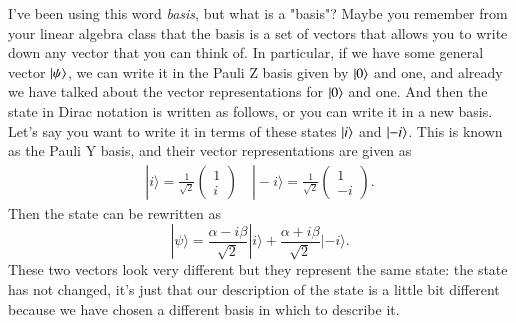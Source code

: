 I've been using this word \emph{basis}, but what is a "basis"? Maybe you remember from your linear algebra class that the basis is a set of vectors that allows you to write down any vector that you can think of. In particular, if we have some general vector $\ket{\psi}$, we can write it in the Pauli Z basis given by $\ket{0}$ and one, and already we have talked about the vector representations for $\ket{0}$ and one. And then the state in Dirac notation is written as follows, or you can write it in a new basis. Let's say you want to write it in terms of these states $\ket{i}$ and $\ket{-i}$. This is known as the Pauli Y basis, and their vector representations are given as
\begin{align}
    |i\rangle=\frac{1}{\sqrt{2}}\left(\begin{array}{l}1 \\ i\end{array}\right) \quad|-i\rangle=\frac{1}{\sqrt{2}}\left(\begin{array}{c}1 \\ -i\end{array}\right).
\end{align}
Then the state can be rewritten as
\begin{equation}
|\psi\rangle=\frac{\alpha-i \beta}{\sqrt{2}}|i\rangle+\frac{\alpha+i \beta}{\sqrt{2}}|-i\rangle.
\end{equation}
These two vectors look very different but they represent the same state: the state has not changed, it's just that our description of the state is a little bit different because we have chosen a different basis in which to describe it.


